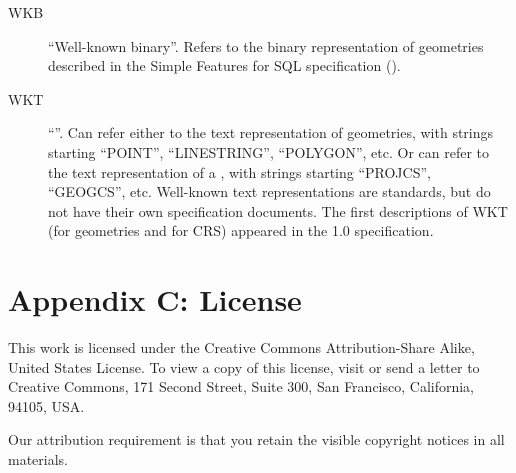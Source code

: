 \documentclass[a4paper,11pt,english]{sphinxmanual}
\begin{document}
\begin{description}
\item[{WKB\label{\detokenize{glossary:term-wkb}}}] \leavevmode
“Well-known binary”. Refers to the binary representation of geometries described in the Simple Features for SQL specification ({\hyperref[\detokenize{glossary:term-sfsql}]{}}).

\item[{WKT\label{\detokenize{glossary:term-wkt}}}] \leavevmode
“”. Can refer either to the text representation of geometries, with strings starting “POINT”, “LINESTRING”, “POLYGON”, etc. Or can refer to the text representation of a {\hyperref[\detokenize{glossary:term-crs}]{}}, with strings starting “PROJCS”, “GEOGCS”, etc.  Well-known text representations are {\hyperref[\detokenize{glossary:term-ogc}]{}} standards, but do not have their own specification documents. The first descriptions of WKT (for geometries and for CRS) appeared in the {\hyperref[\detokenize{glossary:term-sfsql}]{}} 1.0 specification.

\end{description}


\chapter{Appendix C: License}
\label{\detokenize{license:appendix-c-license}}\label{\detokenize{license:license}}\label{\detokenize{license::doc}}
This work is licensed under the Creative Commons Attribution-Share Alike, United States License. To view a copy of this license, visit  or send a letter to Creative Commons, 171 Second Street, Suite 300, San Francisco, California, 94105, USA.

Our attribution requirement is that you retain the visible copyright notices in all materials.



\renewcommand{\indexname}{Index}
\printindex
\end{document}
